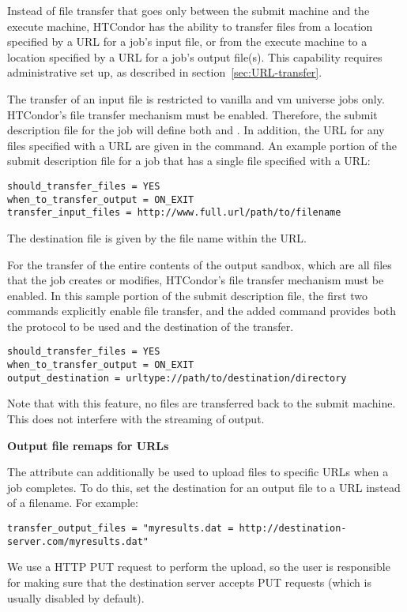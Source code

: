 Instead of file transfer that goes only between the submit machine
and the execute machine,
HTCondor has the ability to transfer files from a location specified
by a URL for a job's input file,
or from the execute machine to a location specified by a URL
for a job's output file(s).
This capability requires administrative set up, 
as described in section~\ref{sec:URL-transfer}.

The transfer of an input file is restricted to
vanilla and vm universe jobs only.
HTCondor's file transfer mechanism must be enabled.
Therefore, the submit description file for the job will define both
 and .
In addition, the URL for any files specified with a URL are
given in the  command.
An example portion of the submit description file for a job
that has a single file specified with a URL:

\footnotesize
\begin{verbatim}
should_transfer_files = YES
when_to_transfer_output = ON_EXIT
transfer_input_files = http://www.full.url/path/to/filename
\end{verbatim}
\normalsize

The destination file is given by the file name within the URL. 

For the transfer of the entire contents of the output sandbox,
which are all files that the job creates or modifies,
HTCondor's file transfer mechanism must be enabled.
In this sample portion of the submit description file,
the first two commands explicitly enable file transfer,
and the added  command provides
both the protocol to be used and the destination of the transfer.
\footnotesize
\begin{verbatim}
should_transfer_files = YES
when_to_transfer_output = ON_EXIT
output_destination = urltype://path/to/destination/directory
\end{verbatim}
\normalsize
Note that with this feature, no files are transferred back to the 
submit machine.  
This does not interfere with the streaming of output.

\textbf{Output file remaps for URLs}

The  attribute can additionally be used to upload 
files to specific URLs when a job completes. To do this, set the destination 
for an output file to a URL instead of a filename. For example:
\footnotesize
\begin{verbatim}
transfer_output_files = "myresults.dat = http://destination-server.com/myresults.dat"
\end{verbatim}
\normalsize
We use a HTTP PUT request to perform the upload, so the user is responsible 
for making sure that the destination server accepts PUT requests (which is 
usually disabled by default).

